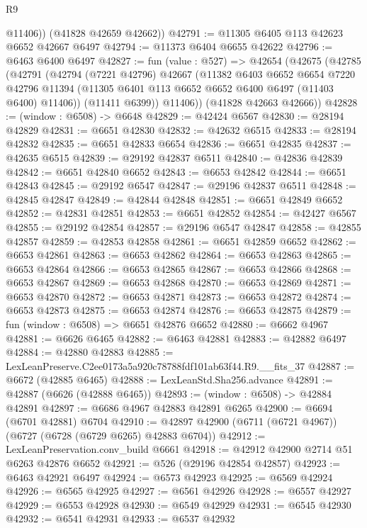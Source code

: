 \begin{lexlean}{R9}
\begin{coremodule}
          @11406))
      (@41828 @42659 @42662))
@42791 := @11305 @6405 @113 @42623 @6652 @42667 @6497
@42794 := @11373 @6404 @6655 @42622
@42796 := @6463 @6400 @6497
@42827 := fun (value : @527) =>
  @42654
    (@42675
      (@42785
        (@42791
          (@42794
            (@7221 @42796)
            @42667
            (@11382
              @6403
              @6652
              @6654
              @7220
              @42796
              @11394
              (@11305 @6401 @113 @6652 @6652 @6400 @6497 (@11403 @6400) @11406))
            (@11411 @6399))
          @11406))
      (@41828 @42663 @42666))
@42828 := (window : @6508) -> @6648
@42829 := @42424 @6567
@42830 := @28194 @42829
@42831 := @6651 @42830
@42832 := @42632 @6515
@42833 := @28194 @42832
@42835 := @6651 @42833 @6654
@42836 := @6651 @42835
@42837 := @42635 @6515
@42839 := @29192 @42837 @6511
@42840 := @42836 @42839
@42842 := @6651 @42840 @6652
@42843 := @6653 @42842
@42844 := @6651 @42843
@42845 := @29192 @6547
@42847 := @29196 @42837 @6511
@42848 := @42845 @42847
@42849 := @42844 @42848
@42851 := @6651 @42849 @6652
@42852 := @42831 @42851
@42853 := @6651 @42852
@42854 := @42427 @6567
@42855 := @29192 @42854
@42857 := @29196 @6547 @42847
@42858 := @42855 @42857
@42859 := @42853 @42858
@42861 := @6651 @42859 @6652
@42862 := @6653 @42861
@42863 := @6653 @42862
@42864 := @6653 @42863
@42865 := @6653 @42864
@42866 := @6653 @42865
@42867 := @6653 @42866
@42868 := @6653 @42867
@42869 := @6653 @42868
@42870 := @6653 @42869
@42871 := @6653 @42870
@42872 := @6653 @42871
@42873 := @6653 @42872
@42874 := @6653 @42873
@42875 := @6653 @42874
@42876 := @6653 @42875
@42879 := fun (window : @6508) => @6651 @42876 @6652
@42880 := @6662 @4967
@42881 := @6626 @6465
@42882 := @6463 @42881
@42883 := @42882 @6497
@42884 := @42880 @42883
@42885 := LexLeanPreserve.C2ee0173a5a920c78788fdf101ab63f44.R9.__fits_37
@42887 := @6672 (@42885 @6465)
@42888 := LexLeanStd.Sha256.advance
@42891 := @42887 (@6626 (@42888 @6465))
@42893 := (window : @6508) -> @42884 @42891
@42897 := @6686 @4967 @42883 @42891 @6265
@42900 := @6694 (@6701 @42881) @6704
@42910 := @42897 @42900 (@6711 (@6721 @4967)) (@6727 (@6728 (@6729 @6265) @42883 @6704))
@42912 := LexLeanPreservation.conv_build @6661
@42918 := @42912 @42900 @2714 @51 @6263 @42876 @6652
@42921 := @526 (@29196 @42854 @42857)
@42923 := @6463 @42921 @6497
@42924 := @6573 @42923
@42925 := @6569 @42924
@42926 := @6565 @42925
@42927 := @6561 @42926
@42928 := @6557 @42927
@42929 := @6553 @42928
@42930 := @6549 @42929
@42931 := @6545 @42930
@42932 := @6541 @42931
@42933 := @6537 @42932

\end{coremodule}
\end{lexlean}
